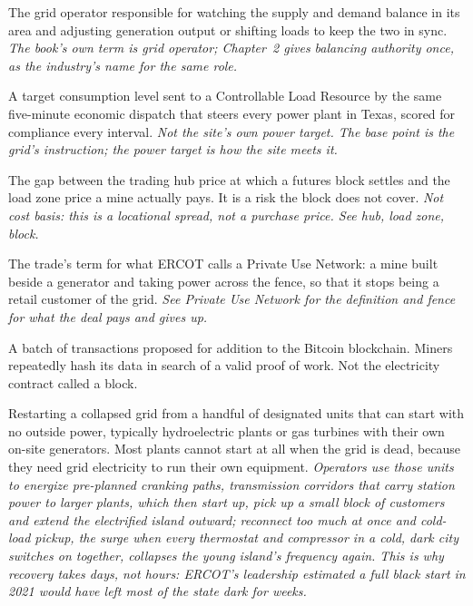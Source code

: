 \begin{description}[leftmargin=0pt,style=unboxed,itemsep=0.35em,parsep=0.15em]
\item[balancing authority] \hypertarget{glossary:balancing-authority}{}The grid operator responsible for watching the supply and demand balance in its area and adjusting generation output or shifting loads to keep the two in sync. \emph{The book's own term is grid operator; Chapter~2 gives balancing authority once, as the industry's name for the same role.}
\item[base point] \hypertarget{glossary:base-point}{}A target consumption level sent to a Controllable Load Resource by the same five-minute economic dispatch that steers every power plant in Texas, scored for compliance every interval. \emph{Not the site's own power target. The base point is the grid's instruction; the power target is how the site meets it.}
\item[basis] \hypertarget{glossary:basis}{}The gap between the trading hub price at which a futures block settles and the load zone price a mine actually pays. It is a risk the block does not cover. \emph{Not cost basis: this is a locational spread, not a purchase price. See hub, load zone, block.}
\item[behind the meter] \hypertarget{glossary:behind-the-meter}{}The trade's term for what ERCOT calls a Private Use Network: a mine built beside a generator and taking power across the fence, so that it stops being a retail customer of the grid. \emph{See Private Use Network for the definition and fence for what the deal pays and gives up.}
\item[Bitcoin block] \hypertarget{glossary:bitcoin-block}{}A batch of transactions proposed for addition to the Bitcoin blockchain. Miners repeatedly hash its data in search of a valid proof of work. Not the electricity contract called a block.
\item[black start] \hypertarget{glossary:black-start}{}Restarting a collapsed grid from a handful of designated units that can start with no outside power, typically hydroelectric plants or gas turbines with their own on-site generators. Most plants cannot start at all when the grid is dead, because they need grid electricity to run their own equipment. \emph{Operators use those units to energize pre-planned cranking paths, transmission corridors that carry station power to larger plants, which then start up, pick up a small block of customers and extend the electrified island outward; reconnect too much at once and cold-load pickup, the surge when every thermostat and compressor in a cold, dark city switches on together, collapses the young island's frequency again. This is why recovery takes days, not hours: ERCOT's leadership estimated a full black start in 2021 would have left most of the state dark for weeks.}

\end{description}
